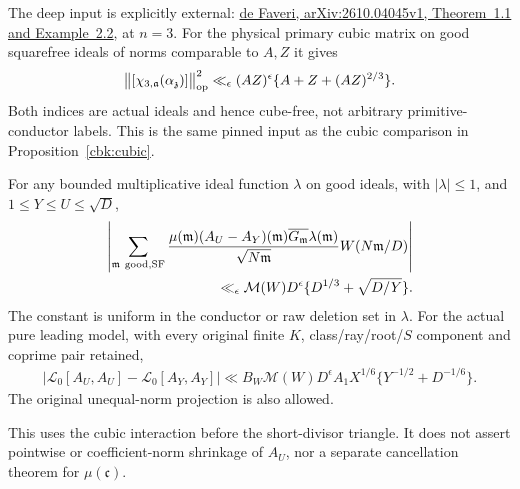 The deep input is explicitly external:
\href{https://arxiv.org/abs/2610.04045v1}{de Faveri,
arXiv:2610.04045v1, Theorem~1.1 and Example~2.2}, at $n=3$.
For the physical primary cubic matrix on good squarefree ideals
of norms comparable to $A,Z$ it gives
\begin{equation}\label{gtl:cubic-input}
 \bigl\|[\chi_{3,\mathfrak a}(\alpha_{\mathfrak z})]\bigr\|_{\rm op}^2
  \ll_\epsilon (AZ)^\epsilon
           \{A+Z+(AZ)^{2/3}\}.
\end{equation}
Both indices are actual ideals and hence cube-free, not arbitrary
primitive-conductor labels. This is the same pinned input as the
cubic comparison in Proposition~\ref{cbk:cubic}.

\begin{theorem}
\label{gtl:tail-theorem}
For any bounded multiplicative ideal function $\lambda$ on good
ideals, with $|\lambda|\le1$, and $1\le Y\le U\le\sqrt D$,
\begin{equation}\label{gtl:linear-tail}
 \begin{split}
 \left|\sum_{\mathfrak m\ {\rm good,SF}}
  \frac{\mu(\mathfrak m)(A_U-A_Y)(\mathfrak m)
          \overline{G_{\mathfrak m}}\lambda(\mathfrak m)}
       {\sqrt{N\mathfrak m}}W(N\mathfrak m/D)\right|\\
 \ll_\epsilon\mathcal M(W)D^\epsilon
                   \{D^{1/3}+\sqrt{D/Y}\}.
 \end{split}
\end{equation}
The constant is uniform in the conductor or raw deletion set in
$\lambda$. For the actual pure leading model, with every original
finite $K$, class/ray/root/$S$ component and coprime pair retained,
\begin{equation}\label{gtl:finite-tail}
 \begin{split}
 |\mathcal L_0[A_U,A_U]-\mathcal L_0[A_Y,A_Y]|
 \ll B_W\mathcal M(W)D^\epsilon A_1X^{1/6}
                       \{Y^{-1/2}+D^{-1/6}\}.
 \end{split}
\end{equation}
The original unequal-norm projection is also allowed.
\end{theorem}
This uses the cubic interaction before the short-divisor triangle.
It does not assert pointwise or coefficient-norm shrinkage of $A_U$,
nor a separate cancellation theorem for $\mu(\mathfrak c)$.


